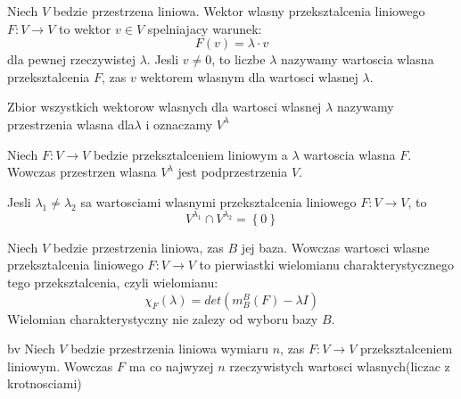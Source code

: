 \documentclass{article}
\begin{document}
\begin{tcolorbox}[colback=white!90!red,colframe=black!35!red,title=Definicja 3.1 Wartosci i wektory wlasne- rzeczywiste]

Niech $V$ bedzie przestrzena liniowa. Wektor wlasny przeksztalcenia liniowego $F:V \rightarrow V$ to wektor $v \in V$ spelniajacy warunek: $$F(v) = \lambda \cdot v$$
dla pewnej rzeczywistej $\lambda$. Jesli $v \neq 0$, to liczbe $\lambda$ nazywamy wartoscia wlasna przeksztalcenia $F$, zas $v$ wektorem wlasnym dla wartosci wlasnej $\lambda$. 

Zbior wszystkich wektorow wlasnych dla wartosci wlasnej $\lambda$ nazywamy przestrzenia wlasna dla$ \lambda$ i oznaczamy $V^{\lambda}$

\end{tcolorbox}


\begin{tcolorbox}[colback=white!90!green,colframe=black!35!green,title=Fakt 3.1-3.2 Przestrzen wlasna i jej przekroj.]

Niech $F:V \rightarrow V$ bedzie przeksztalceniem liniowym a $\lambda$ wartoscia wlasna $F$. Wowczas przestrzen wlasna $V^{\lambda}$ jest podprzestrzenia $V$.

Jesli $ {\lambda}_{1} \neq {\lambda}_{2}$ sa wartosciami wlasnymi przeksztalcenia liniowego $F: V \rightarrow V$, to $$ V^{{\lambda}_{1}} \cap V^{{\lambda}_{2}} = \left\{0\right\}$$

\end{tcolorbox}

\begin{tcolorbox}[colback=white!90!green,colframe=black!35!green,title=Fakt 3.4 Wielomian charakterystyczny]

Niech $V$ bedzie przestrzenia liniowa, zas $B$ jej baza. Wowczas wartosci wlasne przeksztalcenia liniowego $F: V \rightarrow V$ to pierwiastki wielomianu charakterystycznego tego przeksztalcenia, czyli wielomianu: 
$${\chi}_{F}(\lambda) = det(m_{B}^{B}(F) - \lambda I)$$ 
Wielomian charakterystyczny nie zalezy od wyboru bazy $B$.
\end{tcolorbox}

\begin{tcolorbox}[colback=white!90!green,colframe=black!35!green,title=Wniosek 3.5 Liczba wartosci wlasnych]
bv
Niech $V$ bedzie przestrzenia liniowa wymiaru $n$, zas $F: V \rightarrow V$ przeksztalceniem liniowym. Wowczas $F$ ma co najwyzej $n$ rzeczywistych wartosci wlasnych(liczac z krotnosciami)

\end{tcolorbox}
\end{document}
